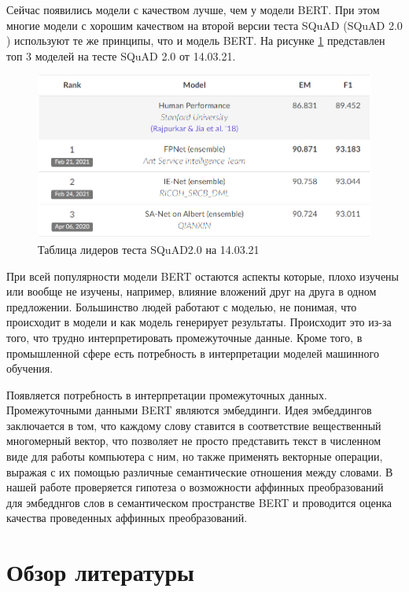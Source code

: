 \documentclass[a4paper,14pt]{article}
\begin{document}
	Сейчас появились модели с качеством лучше, чем у модели BERT. 
	При этом многие модели с хорошим качеством на второй версии теста SQuAD \cite{SQuAD} (SQuAD 2.0 \cite{SQuAD2}) используют те же принципы, что и модель BERT.
	На рисунке \ref{fig:quality140321} представлен топ 3 моделей на тесте SQuAD 2.0 \cite{SQuAD2} от 14.03.21.
	
	\begin{figure}[H]
		\centering
		\includegraphics[width=0.6\linewidth]{images/quality_14_03_21}
		\caption{Таблица лидеров теста SQuAD2.0 на 14.03.21}
		\label{fig:quality140321}
	\end{figure}

	При всей популярности модели BERT остаются аспекты которые, плохо изучены или вообще не изучены, например, влияние вложений друг на друга в одном предложении.
	Большинство людей работают с моделью, не понимая, что происходит в модели и как модель генерирует результаты.
	Происходит это из-за того, что трудно интерпретировать промежуточные данные.
	Кроме того, в промышленной сфере есть потребность в интерпретации моделей машинного обучения.
	
	Появляется потребность в интерпретации промежуточных данных.
	Промежуточными данными BERT являются эмбеддинги.
	Идея эмбеддингов заключается в том, что каждому слову ставится в соответствие вещественный многомерный вектор, что позволяет не просто представить текст в численном виде для работы компьютера с ним, но также применять векторные операции, выражая с их помощью различные семантические отношения между словами. 
	В нашей работе проверяется гипотеза о возможности аффинных преобразований для эмбедднгов слов в семантическом пространстве BERT и проводится оценка качества проведенных аффинных преобразований.
	

	
	
	

	\pagebreak
	
	\section{Обзор литературы}
	
\end{document}
